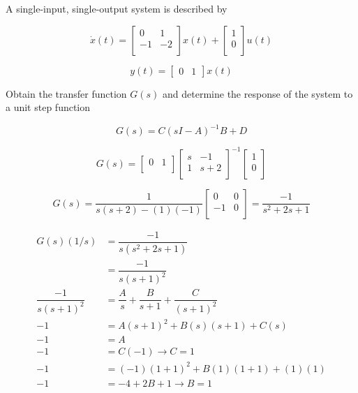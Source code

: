 \documentclass[11pt]{article}
\begin{document}
A single-input, single-output system is described by

\[
    \dot x(t) =
    \begin{bmatrix}
        0 & 1 \\
        -1 & -2 \\
    \end{bmatrix}
    x(t) +
    \begin{bmatrix}
        1 \\
        0 \\
    \end{bmatrix}
    u(t)
\]

\[ y(t) = \begin{bmatrix} 0 & 1 \end{bmatrix} x(t) \]

Obtain the transfer function $G(s)$ and determine the response of the system to a unit step function

\[ G(s) = C(sI - A)^{-1}B + D \]

\[
    G(s) =
    \begin{bmatrix}
        0 & 1 \\
    \end{bmatrix}
    \begin{bmatrix}
        s & -1 \\
        1 & s + 2 \\
    \end{bmatrix}^{-1}
    \begin{bmatrix}
        1 \\
        0 \\
    \end{bmatrix}
\]

\[
    G(s) =
    \dfrac{1}{s(s + 2) - (1)(-1)}
    \begin{bmatrix}
        0 & 0 \\
        -1 & 0 \\
    \end{bmatrix}
    = \dfrac{-1}{s^2 + 2s + 1}
\]

\begin{align*}
    G(s) (1/s) &= \dfrac{-1}{s(s^2 + 2s + 1)} \\
    &= \dfrac{-1}{s(s + 1)^2} \\
    \dfrac{-1}{s(s + 1)^2} &= \dfrac{A}{s} + \dfrac{B}{s + 1} + \dfrac{C}{(s + 1)^2} \\
    -1 &= A (s + 1)^2 + B (s) (s + 1) + C (s) \\
    -1 &= A \tag{$s = 0$} \\
    -1 &= C (-1) \xrightarrow{} C = 1 \tag{$s = -1$} \\
    -1 &= (-1) (1 + 1)^2 + B (1) (1 + 1) + (1) (1) \tag{$s = 1$} \\
    -1 &= -4 + 2B + 1 \xrightarrow{} B = 1 \\
\end{align*}
\end{document}
